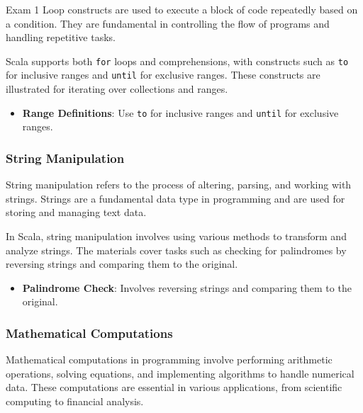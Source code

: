 \begin{examnotes}{Exam 1}
    Loop constructs are used to execute a block of code repeatedly based on a condition. They are fundamental in controlling the flow of programs and handling repetitive tasks.
    
    \begin{highlight}
        Scala supports both \texttt{for} loops and comprehensions, with constructs such as \texttt{to} for inclusive ranges and \texttt{until} for exclusive ranges. These constructs are 
        illustrated for iterating over collections and ranges.
    
        \begin{itemize}
            \item \textbf{Range Definitions}: Use \texttt{to} for inclusive ranges and \texttt{until} for exclusive ranges.
        \end{itemize}
    \end{highlight}
    
    \subsubsection*{String Manipulation}
    
    String manipulation refers to the process of altering, parsing, and working with strings. Strings are a fundamental data type in programming and are used for storing and managing text data.
    
    \begin{highlight}
        In Scala, string manipulation involves using various methods to transform and analyze strings. The materials cover tasks such as checking for palindromes by reversing strings and 
        comparing them to the original.
    
        \begin{itemize}
            \item \textbf{Palindrome Check}: Involves reversing strings and comparing them to the original.
        \end{itemize}
    \end{highlight}
    
    \subsubsection*{Mathematical Computations}
    
    Mathematical computations in programming involve performing arithmetic operations, solving equations, and implementing algorithms to handle numerical data. These computations are 
    essential in various applications, from scientific computing to financial analysis.
    

\end{examnotes}
